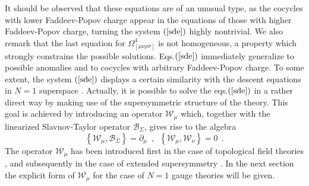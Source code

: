 \documentclass[a4paper,12pt]{article}
\begin{document}
It should be observed that these equations are of an unusual type, as the
cocycles with lower Faddeev-Popov charge appear in the equations of those
with higher Faddeev-Popov charge, turning the system $\left( \ref{sde}%
\right) $ highly nontrivial. We also remark that the last equation for $%
\Omega _{[\mu \nu \rho \sigma ]}^{4}$ is not homogeneous, a property which
strongly constrains the possible solutions. Eqs.$\left( \ref{sde}\right) $
immediately generalize to possible anomalies and to cocycles with arbitrary
Faddeev-Popov charge. To some extent, the system $\left( \ref{sde}\right) $
displays a certain similarity with the descent equations in $N=1$ superspace 
\cite{sp}. Actually, it is possible to solve the eqs.$\left( \ref{sde}%
\right) $ in a rather direct way by making use of the supersymmetric
structure of the theory. This goal is achieved by introducing an operator $%
\mathcal{W}_{\mu }$ which, together with the linearized Slavnov-Taylor
operator $\mathcal{B}_{\Sigma }$, gives rise to the algebra 
\[
\left\{ \mathcal{W}_{\mu },\mathcal{B}_{\Sigma }\right\} =\partial _{\mu
}\,\,\,,\,\,\,\left\{ \mathcal{W}_{\mu },\mathcal{W}_{\nu }\right\} =0\,\;%
\mathrm{.}
\]
The operator $\mathcal{W}_{\mu }$ has been introduced first in the case of
topological field theories \cite{tp,tp1}, and subsequently in the case of
extended supersymmetry \cite{th,n41}. In the next section the explicit form
of $\mathcal{W}_{\mu }$ for the case of $N=1$ gauge theories will be given.
\end{document}
